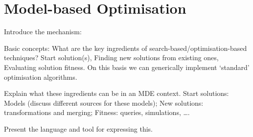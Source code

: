\section{Model-based Optimisation}
\label{section:mde_optimisation}

	\begin{draftlist}
		Introduce the mechanism:
		\item Basic concepts: What are the key ingredients of search-based/optimisation-based techniques? Start solution(s), Finding new solutions from existing
					ones, Evaluating solution fitness. On this basis we can generically implement `standard' optimisation algorithms.
		\item Explain what these ingredients can be in an MDE context. Start solutions: Models (discuss different sources for these models); New solutions:
					transformations and merging; Fitness: queries, simulations, \ldots. 
		\item Present the language and tool for expressing this.
	\end{draftlist}
